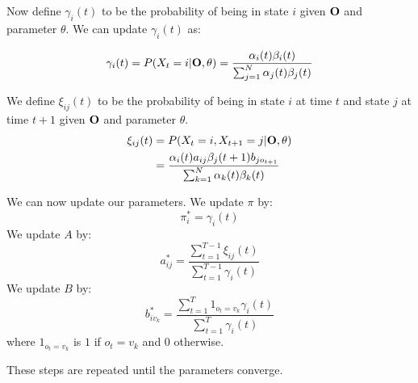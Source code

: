 Now define $\gamma_i(t)$ to be the probability of being in state $i$ given $\bold{O}$ and parameter $\theta$. We can update $\gamma_i(t)$ as:

\begin{equation} \label{gamma}
\gamma_i(t) = P(X_t = i | \bold{O}, \theta) = \frac{\alpha_i(t) \beta_i(t)}{\sum_{j=1}^N \alpha_j(t) \beta_j(t)}
\end{equation}

We define $\xi_{ij}(t)$ to be the probability of being in state $i$ at time $t$ and state $j$ at time $t+1$ given $\bold{O}$ and parameter $\theta$. 
\begin{equation}\label{xi}
\begin{aligned}
\xi_{ij}(t) &= P(X_t = i, X_{t+1} = j | \bold{O}, \theta)  \\
&=\frac{\alpha_i(t) a_{ij} \beta_j(t+1)b_{jo_{t+1}}}{\sum_{k=1}^N \alpha_k(t) \beta_k(t)}
\end{aligned}
\end{equation}

We can now update our parameters. We update $\pi$ by:
\begin{equation}\label{pi}
\pi_i^* = \gamma_i(t)
\end{equation}
We update $A$ by:
\begin{equation}\label{a}
a^*_{ij} = \frac{\sum_{t=1}^{T-1}\xi_{ij}(t)}{\sum_{t=1}^{T-1}\gamma_i(t)}
\end{equation}
We update $B$ by:
\begin{equation}\label{b}
b^*_{iv_k} = \frac{\sum_{t=1}^{T}1_{o_t = v_k} \gamma_i(t)}{\sum_{t=1}^T \gamma_i(t)}
\end{equation}
where $1_{o_t = v_k}$ is $1$ if $o_t = v_k$ and $0$ otherwise. 

These steps are repeated until the parameters converge. 